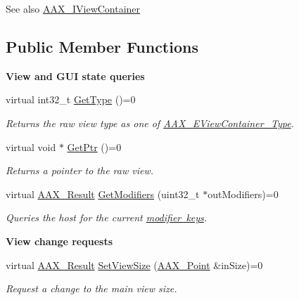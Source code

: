 \begin{DoxySeeAlso}{See also}
\mbox{\hyperlink{a01889}{A\+A\+X\+\_\+\+I\+View\+Container}} 
\end{DoxySeeAlso}
\subsection*{Public Member Functions}
\begin{Indent}\textbf{ View and G\+UI state queries}\par
\begin{DoxyCompactItemize}
\item 
virtual int32\+\_\+t \mbox{\hyperlink{a01765_ac3741d648a766bab6ab292214db42f76}{Get\+Type}} ()=0
\begin{DoxyCompactList}\small\item\em Returns the raw view type as one of \mbox{\hyperlink{a00503_ab4c36de253fc80b541eb51074c64caef}{A\+A\+X\+\_\+\+E\+View\+Container\+\_\+\+Type}}. \end{DoxyCompactList}\item 
virtual void $\ast$ \mbox{\hyperlink{a01765_a180a3f3407999231d78d437243c70506}{Get\+Ptr}} ()=0
\begin{DoxyCompactList}\small\item\em Returns a pointer to the raw view. \end{DoxyCompactList}\item 
virtual \mbox{\hyperlink{a00392_a4d8f69a697df7f70c3a8e9b8ee130d2f}{A\+A\+X\+\_\+\+Result}} \mbox{\hyperlink{a01765_a2dcb6da5a296c9b5d9f67c40880606f1}{Get\+Modifiers}} (uint32\+\_\+t $\ast$out\+Modifiers)=0
\begin{DoxyCompactList}\small\item\em Queries the host for the current \mbox{\hyperlink{a00491_a47756e0a56d00468b7045eb26500cb78}{modifier keys}}. \end{DoxyCompactList}\end{DoxyCompactItemize}
\end{Indent}
\begin{Indent}\textbf{ View change requests}\par
\begin{DoxyCompactItemize}
\item 
virtual \mbox{\hyperlink{a00392_a4d8f69a697df7f70c3a8e9b8ee130d2f}{A\+A\+X\+\_\+\+Result}} \mbox{\hyperlink{a01765_a51e307abdc817dc20582e87d5b0b32e3}{Set\+View\+Size}} (\mbox{\hyperlink{a01609}{A\+A\+X\+\_\+\+Point}} \&in\+Size)=0
\begin{DoxyCompactList}\small\item\em Request a change to the main view size. \end{DoxyCompactList}\end{DoxyCompactItemize}
\end{Indent}
